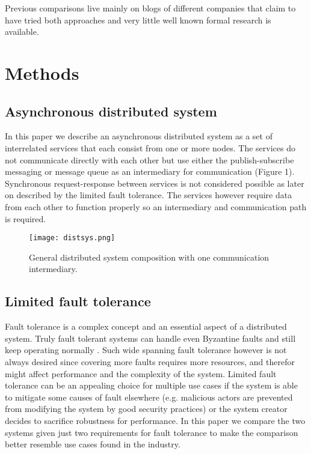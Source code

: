 \documentclass[conference]{IEEEtran}
\begin{document}
\indent Previous comparisons live mainly on blogs of different companies that claim to have tried both approaches and very little well known formal research is available.

\section{Methods}

\subsection{Asynchronous distributed system}
In this paper we describe an asynchronous distributed system as a set of interrelated services that each consist from one or more nodes. The services do not communicate directly with each other but use either the publish-subscribe messaging or message queue as an intermediary for communication (Figure 1). Synchronous request-response between services is not considered possible as later on described by the limited fault tolerance. The services however require data from each other to function properly so an intermediary and communication path is required.

\begin{figure}
    \centering
    \texttt{[image: distsys.png]}
    \caption{General distributed system composition with one communication intermediary.}
\end{figure}

\subsection{Limited fault tolerance}
Fault tolerance is a complex concept and an essential aspect of a distributed system. Truly fault tolerant systems can handle even Byzantine faults and still keep operating normally \cite{pracbyzfaultol}. Such wide spanning fault tolerance however is not always desired since covering more faults requires more resources, and therefor might affect performance and the complexity of the system. Limited fault tolerance can be an appealing choice for multiple use cases if the system is able to mitigate some causes of fault elsewhere (e.g. malicious actors are prevented from modifying the system by good security practices) or the system creator decides to sacrifice robustness for performance. In this paper we compare the two systems given just two requirements for fault tolerance to make the comparison better resemble use cases found in the industry.
\end{document}

